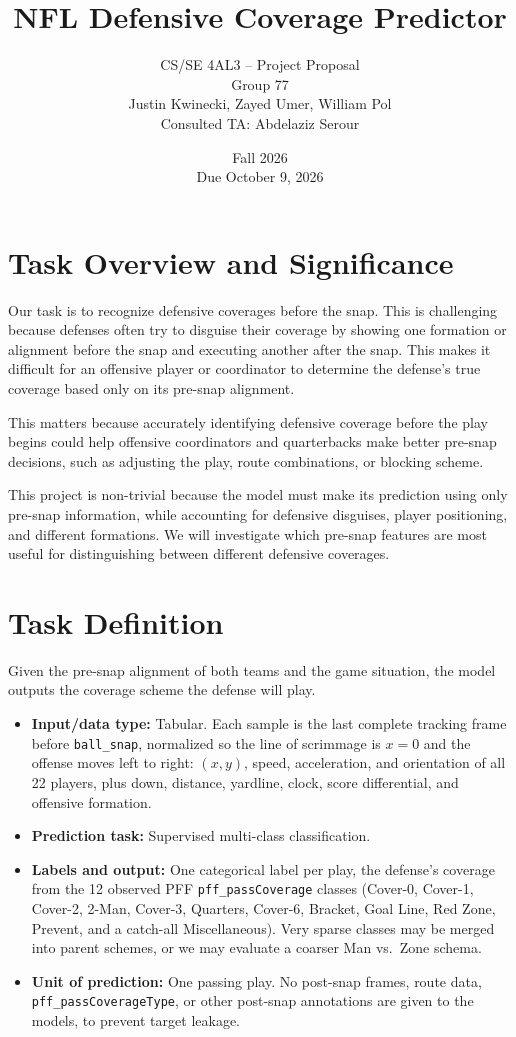 \documentclass[12pt]{article}
\title{\vspace{-1.5em}\textbf{NFL Defensive Coverage Predictor}}
\author{CS/SE 4AL3 -- Project Proposal \\ Group 77 \\ Justin Kwinecki, Zayed Umer, William Pol \\ Consulted TA: Abdelaziz Serour}
\date{Fall 2026 \\ Due October 9, 2026}
\begin{document}
\maketitle
\section*{Task Overview and Significance}

Our task is to recognize defensive coverages before the snap. This is challenging because defenses often try to disguise their coverage by showing one formation or alignment before the snap and executing another after the snap. This makes it difficult for an offensive player or coordinator to determine the defense's true coverage based only on its pre-snap alignment.

This matters because accurately identifying defensive coverage before the play begins could help offensive coordinators and quarterbacks make better pre-snap decisions, such as adjusting the play, route combinations, or blocking scheme.

This project is non-trivial because the model must make its prediction using only pre-snap information, while accounting for defensive disguises, player positioning, and different formations. We will investigate which pre-snap features are most useful for distinguishing between different defensive coverages.

\section*{Task Definition}
Given the pre-snap alignment of both teams and the game situation, the model outputs the coverage scheme the defense will play.

\begin{itemize}
  \item \textbf{Input/data type:} Tabular. Each sample is the last complete tracking frame before \texttt{ball\_snap}, normalized so the line of scrimmage is $x = 0$ and the offense moves left to right: $(x, y)$, speed, acceleration, and orientation of all 22 players, plus down, distance, yardline, clock, score differential, and offensive formation.
  \item \textbf{Prediction task:} Supervised multi-class classification.
  \item \textbf{Labels and output:} One categorical label per play, the defense's coverage from the 12 observed PFF \texttt{pff\_passCoverage} classes (Cover-0, Cover-1, Cover-2, 2-Man, Cover-3, Quarters, Cover-6, Bracket, Goal Line, Red Zone, Prevent, and a catch-all Miscellaneous). Very sparse classes may be merged into parent schemes, or we may evaluate a coarser Man vs.\ Zone schema.
  \item \textbf{Unit of prediction:} One passing play. No post-snap frames, route data, \texttt{pff\_passCoverageType}, or other post-snap annotations are given to the models, to prevent target leakage.
\end{itemize}
\end{document}
